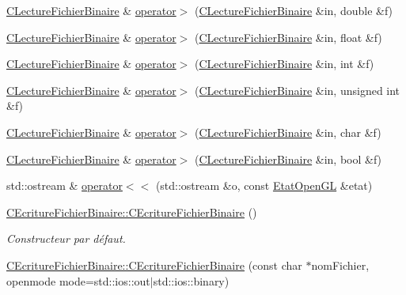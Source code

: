 \begin{DoxyCompactItemize}
\item 
\hyperlink{class_c_lecture_fichier_binaire}{C\+Lecture\+Fichier\+Binaire} \& \hyperlink{group__utilitaire_ga3286b1bfce354ab81b9c5e16318f3726}{operator$>$} (\hyperlink{class_c_lecture_fichier_binaire}{C\+Lecture\+Fichier\+Binaire} \&in, double \&f)
\item 
\hyperlink{class_c_lecture_fichier_binaire}{C\+Lecture\+Fichier\+Binaire} \& \hyperlink{group__utilitaire_ga66a0bc917393930593341bc27a7fa51d}{operator$>$} (\hyperlink{class_c_lecture_fichier_binaire}{C\+Lecture\+Fichier\+Binaire} \&in, float \&f)
\item 
\hyperlink{class_c_lecture_fichier_binaire}{C\+Lecture\+Fichier\+Binaire} \& \hyperlink{group__utilitaire_ga06cd33d9234f45523dd443b122d897fa}{operator$>$} (\hyperlink{class_c_lecture_fichier_binaire}{C\+Lecture\+Fichier\+Binaire} \&in, int \&f)
\item 
\hyperlink{class_c_lecture_fichier_binaire}{C\+Lecture\+Fichier\+Binaire} \& \hyperlink{group__utilitaire_gaf02d6718459c6e38d1ef0350b209da02}{operator$>$} (\hyperlink{class_c_lecture_fichier_binaire}{C\+Lecture\+Fichier\+Binaire} \&in, unsigned int \&f)
\item 
\hyperlink{class_c_lecture_fichier_binaire}{C\+Lecture\+Fichier\+Binaire} \& \hyperlink{group__utilitaire_ga81285ae431b1fa84429945395a36f8ce}{operator$>$} (\hyperlink{class_c_lecture_fichier_binaire}{C\+Lecture\+Fichier\+Binaire} \&in, char \&f)
\item 
\hyperlink{class_c_lecture_fichier_binaire}{C\+Lecture\+Fichier\+Binaire} \& \hyperlink{group__utilitaire_ga1585cce945bae21c66998f92f175b115}{operator$>$} (\hyperlink{class_c_lecture_fichier_binaire}{C\+Lecture\+Fichier\+Binaire} \&in, bool \&f)
\item 
std\+::ostream \& \hyperlink{group__utilitaire_ga07715cf8ba84aab7a025770804188a24}{operator$<$$<$} (std\+::ostream \&o, const \hyperlink{class_etat_open_g_l}{Etat\+Open\+G\+L} \&etat)
\item 
\hyperlink{group__utilitaire_ga5b5846202001fecd71cd2a0afbbdb494}{C\+Ecriture\+Fichier\+Binaire\+::\+C\+Ecriture\+Fichier\+Binaire} ()
\begin{DoxyCompactList}\small\item\em Constructeur par défaut. \end{DoxyCompactList}\item 
\hyperlink{group__utilitaire_gad19b9753aa12a9f25fd0febc3c899024}{C\+Ecriture\+Fichier\+Binaire\+::\+C\+Ecriture\+Fichier\+Binaire} (const char $\ast$nom\+Fichier, openmode mode=std\+::ios\+::out$\vert$std\+::ios\+::binary)

\end{DoxyCompactItemize}
